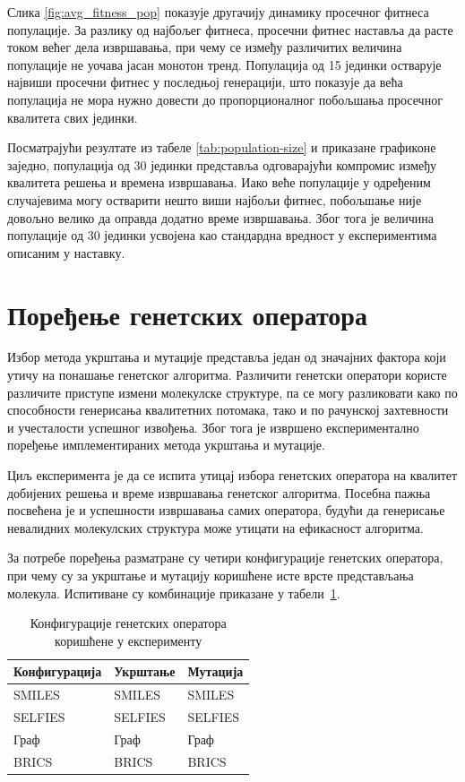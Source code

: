 \documentclass[12pt,oneside]{memoir}
\begin{document}
Слика \ref{fig:avg_fitness_pop} показује другачију 
динамику просечног фитнеса популације. За разлику 
од најбољег фитнеса, просечни фитнес наставља да расте 
током већег дела извршавања, при чему се између 
различитих величина популације не уочава јасан 
монотон тренд. Популација од 15 јединки остварује 
највиши просечни фитнес у последњој генерацији, 
што показује да већа популација не мора нужно довести 
до пропорционалног побољшања просечног квалитета свих 
јединки.

Посматрајући резултате из табеле \ref{tab:population-size} и 
приказане графиконе заједно, популација од 30 јединки 
представља одговарајући компромис између квалитета 
решења и времена извршавања. Иако веће популације у 
одређеним случајевима могу остварити нешто виши 
најбољи фитнес, побољшање није довољно велико да 
оправда додатно време извршавања. Због тога је 
величина популације од 30 јединки усвојена као 
стандардна вредност у експериментима описаним у наставку.


\section{Поређење генетских оператора}
\label{sec:genetic-operators}

Избор метода укрштања и мутације представља један од значајних
фактора који утичу на понашање генетског алгоритма. Различити
генетски оператори користе различите приступе измени молекулске
структуре, па се могу разликовати како по способности генерисања
квалитетних потомака, тако и по рачунској захтевности и учесталости
успешног извођења. Због тога је извршено експериментално поређење
имплементираних метода укрштања и мутације.

Циљ експеримента је да се испита утицај избора генетских оператора
на квалитет добијених решења и време извршавања генетског алгоритма.
Посебна пажња посвећена је и успешности извршавања самих оператора,
будући да генерисање невалидних молекулских структура може утицати
на ефикасност алгоритма.

За потребе поређења разматране су четири конфигурације генетских
оператора, при чему су за укрштање и мутацију коришћене исте врсте
представљања молекула. Испитиване су комбинације приказане у
табели~\ref{tab:operator-config}.

\begin{table}[!ht]
  \centering
  \begin{tabular}{lll}
    \toprule
    \textbf{Конфигурација} & \textbf{Укрштање} & \textbf{Мутација} \\
    \midrule
    SMILES & SMILES & SMILES \\
    SELFIES & SELFIES & SELFIES \\
    Граф & Граф & Граф \\
    BRICS & BRICS & BRICS \\
    \bottomrule
  \end{tabular}
  \caption{Конфигурације генетских оператора коришћене у експерименту}
  \label{tab:operator-config}
\end{table}
\end{document}
